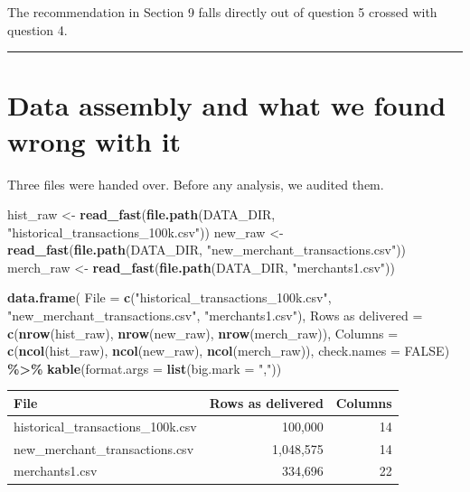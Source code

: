 \documentclass[
]{article}
\newenvironment{Shaded}{\begin{snugshade}}{\end{snugshade}}
\newcommand{\AttributeTok}[1]{\textcolor[rgb]{0.13,0.29,0.53}{#1}}
\newcommand{\ConstantTok}[1]{\textcolor[rgb]{0.56,0.35,0.01}{#1}}
\newcommand{\FunctionTok}[1]{\textcolor[rgb]{0.13,0.29,0.53}{\textbf{#1}}}
\newcommand{\NormalTok}[1]{#1}
\newcommand{\OtherTok}[1]{\textcolor[rgb]{0.56,0.35,0.01}{#1}}
\newcommand{\SpecialCharTok}[1]{\textcolor[rgb]{0.81,0.36,0.00}{\textbf{#1}}}
\newcommand{\StringTok}[1]{\textcolor[rgb]{0.31,0.60,0.02}{#1}}
\newcounter{none} %
\begin{document}
The recommendation in Section 9 falls directly out of question 5 crossed
with question 4.

\begin{center}\rule{0.5\linewidth}{0.5pt}\end{center}

\section{Data assembly and what we found wrong with
it}\label{data-assembly-and-what-we-found-wrong-with-it}

Three files were handed over. Before any analysis, we audited them.

\begin{Shaded}
\begin{Highlighting}[]
\NormalTok{hist\_raw  }\OtherTok{\textless{}{-}} \FunctionTok{read\_fast}\NormalTok{(}\FunctionTok{file.path}\NormalTok{(DATA\_DIR, }\StringTok{"historical\_transactions\_100k.csv"}\NormalTok{))}
\NormalTok{new\_raw   }\OtherTok{\textless{}{-}} \FunctionTok{read\_fast}\NormalTok{(}\FunctionTok{file.path}\NormalTok{(DATA\_DIR, }\StringTok{"new\_merchant\_transactions.csv"}\NormalTok{))}
\NormalTok{merch\_raw }\OtherTok{\textless{}{-}} \FunctionTok{read\_fast}\NormalTok{(}\FunctionTok{file.path}\NormalTok{(DATA\_DIR, }\StringTok{"merchants1.csv"}\NormalTok{))}

\FunctionTok{data.frame}\NormalTok{(}
  \AttributeTok{File =} \FunctionTok{c}\NormalTok{(}\StringTok{"historical\_transactions\_100k.csv"}\NormalTok{, }\StringTok{"new\_merchant\_transactions.csv"}\NormalTok{, }\StringTok{"merchants1.csv"}\NormalTok{),}
  \StringTok{\textasciigrave{}}\AttributeTok{Rows as delivered}\StringTok{\textasciigrave{}} \OtherTok{=} \FunctionTok{c}\NormalTok{(}\FunctionTok{nrow}\NormalTok{(hist\_raw), }\FunctionTok{nrow}\NormalTok{(new\_raw), }\FunctionTok{nrow}\NormalTok{(merch\_raw)),}
  \AttributeTok{Columns =} \FunctionTok{c}\NormalTok{(}\FunctionTok{ncol}\NormalTok{(hist\_raw), }\FunctionTok{ncol}\NormalTok{(new\_raw), }\FunctionTok{ncol}\NormalTok{(merch\_raw)),}
  \AttributeTok{check.names =} \ConstantTok{FALSE}\NormalTok{) }\SpecialCharTok{\%\textgreater{}\%} \FunctionTok{kable}\NormalTok{(}\AttributeTok{format.args =} \FunctionTok{list}\NormalTok{(}\AttributeTok{big.mark =} \StringTok{","}\NormalTok{))}
\end{Highlighting}
\end{Shaded}

{\def\LTcaptype{none} %
\begin{longtable}[]{@{}lrr@{}}
\toprule\noalign{}
File & Rows as delivered & Columns \\
\midrule\noalign{}
\endhead
\bottomrule\noalign{}
\endlastfoot
historical\_transactions\_100k.csv & 100,000 & 14 \\
new\_merchant\_transactions.csv & 1,048,575 & 14 \\
merchants1.csv & 334,696 & 22 \\
\end{longtable}
}
\end{document}
